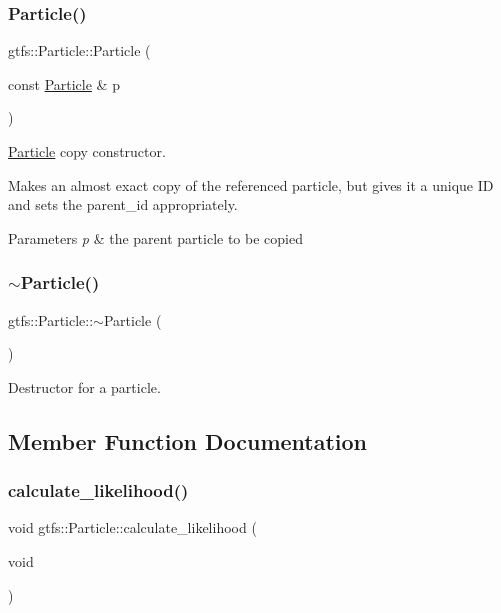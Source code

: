 \subsubsection{\texorpdfstring{Particle()}{Particle()}\hspace{0.1cm}{\footnotesize\ttfamily [2/2]}}
{\footnotesize\ttfamily gtfs\+::\+Particle\+::\+Particle (\begin{DoxyParamCaption}\item[{const \hyperlink{classgtfs_1_1Particle}{Particle} \&}]{p }\end{DoxyParamCaption})}

\hyperlink{classgtfs_1_1Particle}{Particle} copy constructor.

Makes an almost exact copy of the referenced particle, but gives it a unique ID and sets the parent\+\_\+id appropriately.


\begin{DoxyParams}{Parameters}
{\em p} & the parent particle to be copied \\
\hline
\end{DoxyParams}
\mbox{\label{classgtfs_1_1Particle_a3accf3496ad8460b4ad8b3f6da2de411}} 
\subsubsection{\texorpdfstring{$\sim$\+Particle()}{~Particle()}}
{\footnotesize\ttfamily gtfs\+::\+Particle\+::$\sim$\+Particle (\begin{DoxyParamCaption}{ }\end{DoxyParamCaption})}

Destructor for a particle. 

\subsection{Member Function Documentation}
\mbox{\label{classgtfs_1_1Particle_a88627efbe0eb2e289315ae82627d3a39}} 
\subsubsection{\texorpdfstring{calculate\+\_\+likelihood()}{calculate\_likelihood()}}
{\footnotesize\ttfamily void gtfs\+::\+Particle\+::calculate\+\_\+likelihood (\begin{DoxyParamCaption}\item[{void}]{ }\end{DoxyParamCaption})}

